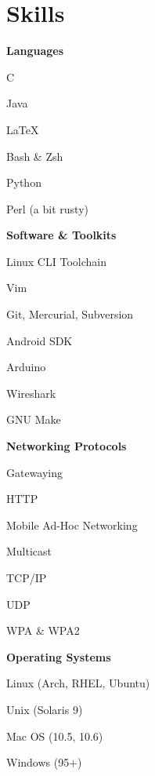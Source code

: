 \documentclass[10pt]{barag_resume}
\begin{document}
	\section{Skills}%
		\begin{minipage}[t]{\textwidth}
		\vspace{-10pt}
		\begin{multicols}{2}
			\textbf{Languages}
			\begin{csitemize}
				\item C
				\item Java
				\item \LaTeX
				\item Bash \& Zsh
				\item Python
				\item Perl (a bit rusty)\columnbreak
			\end{csitemize}

			\textbf{Software \& Toolkits}
			\begin{csitemize}
				\item Linux CLI Toolchain
				\item Vim
				\item Git, Mercurial, Subversion
				\item Android SDK
				\item Arduino
				\item Wireshark
				\item GNU Make
			\end{csitemize}
		\end{multicols}
		\begin{multicols}{2}
			\textbf{Networking Protocols}
			\begin{csitemize}
				\item Gatewaying
				\item HTTP
				\item Mobile Ad-Hoc Networking
				\item Multicast
				\item TCP/IP
				\item UDP
				\item WPA \& WPA2\columnbreak
			\end{csitemize}

			\textbf{Operating Systems}
			\begin{csitemize}
				\item Linux (Arch, RHEL, Ubuntu)
				\item Unix (Solaris 9)
				\item Mac OS (10.5, 10.6)
				\item Windows (95+)
			\end{csitemize}
		\end{multicols}
		\end{minipage}
\end{document}
